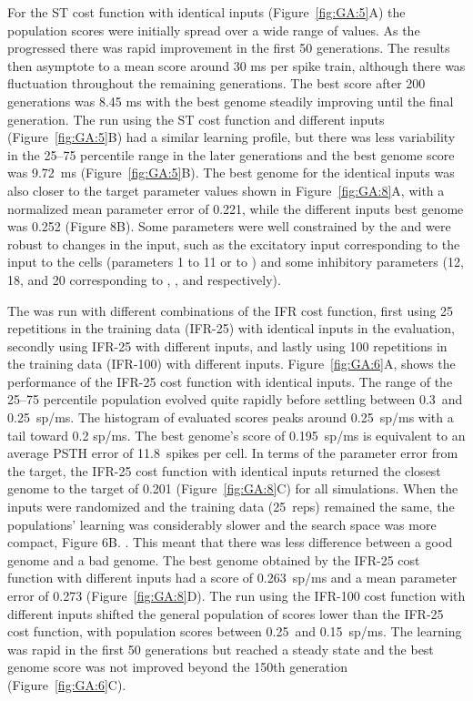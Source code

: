 For the ST cost function with identical {\ANF} inputs
(Figure~\ref{fig:GA:5}A) the population scores were initially spread over
a wide range of values. As the {\GA} progressed there was rapid
improvement in the first 50 generations. The results then asymptote to
a mean score around 30 ms per spike train, although there was
fluctuation throughout the remaining generations.  The best score
after 200 generations was 8.45 ms with the best genome steadily
improving until the final generation.  The {\GA} run using the ST cost
function and different {\ANF} inputs (Figure~\ref{fig:GA:5}B) had a similar
learning profile, but there was less variability in the 25--75
percentile range in the later generations and the best genome score
was 9.72~ms (Figure~\ref{fig:GA:5}B).  The best genome for the identical
inputs was also closer to the target parameter values shown in
Figure~\ref{fig:GA:8}A, with a normalized mean parameter error of 0.221,
while the different inputs {\GAs} best genome was 0.252 (Figure
8B). Some parameters were well constrained by the {\GA} and were robust
to changes in the input, such as the excitatory input corresponding to
the {\ANF} input to the {\CN} cells (parameters 1 to 11 or \wANFTS to
\wLSRGLG) and some inhibitory parameters (12, 18, and 20 corresponding
to \wDSTS, \wGLGTS, and \sGLGTS respectively).

\smallskip{} 

The {\GA} was run with different combinations of the IFR cost function,
first using 25 repetitions in the training data (IFR-25) with
identical {\ANF} inputs in the {\GA} evaluation, secondly using IFR-25 with
different {\ANF} inputs, and lastly using 100 repetitions in the training
data (IFR-100) with different {\ANF} inputs. Figure~\ref{fig:GA:6}A, shows
the {\GA} performance of the IFR-25 cost function with identical
inputs. The range of the 25--75 percentile population evolved quite
rapidly before settling between 0.3~and 0.25~sp/ms.  The histogram of
evaluated scores peaks around 0.25~sp/ms with a tail toward 0.2 sp/ms.
The best genome's score of 0.195~sp/ms is equivalent to an average
PSTH error of 11.8~spikes per cell. In terms of the parameter error
from the target, the IFR-25 cost function with identical inputs
returned the closest genome to the target of 0.201
(Figure~\ref{fig:GA:8}C) for all {\GA} simulations. When the inputs were
randomized and the training data (25~reps) remained the same, the {\GA}
populations' learning was considerably slower and the search space was
more compact, Figure 6B. . This meant that there was less difference between a good
genome and a bad genome.  The best genome obtained by the IFR-25 cost
function with different inputs had a score of 0.263~sp/ms and a mean
parameter error of 0.273 (Figure~\ref{fig:GA:8}D). The {\GA} run using the
IFR-100 cost function with different inputs shifted the general
population of {\GA} scores lower than the IFR-25 cost function, with
population scores between 0.25~and 0.15~sp/ms. The learning was rapid
in the first 50 generations but reached a steady state and the best
genome score was not improved beyond the 150th generation
(Figure~\ref{fig:GA:6}C).  %

